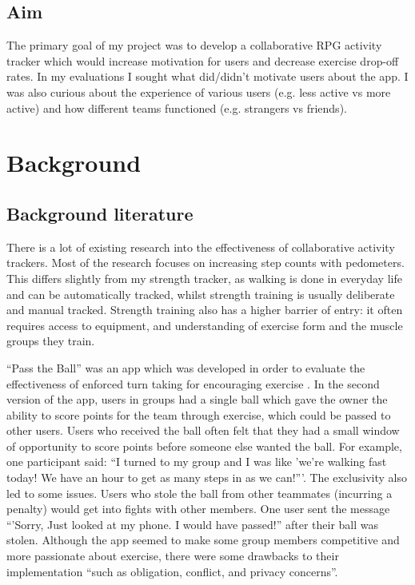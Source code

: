 \documentclass{l4proj}
\begin{document}
\section{Aim}
The primary goal of my project was to develop a collaborative RPG activity tracker which would increase motivation for users and decrease exercise drop-off rates. In my evaluations I sought what did/didn't motivate users about the app. I was also curious about the experience of various users (e.g. less active vs more active) and how different teams functioned (e.g. strangers vs friends).  



\chapter{Background}

\section{Background literature}
There is a lot of existing research into the effectiveness of collaborative activity trackers. Most of the research focuses on increasing step counts with pedometers. This differs slightly from my strength tracker, as walking is done in everyday life and can be automatically tracked, whilst strength training is usually deliberate and manual tracked. Strength training also has a higher barrier of entry: it often requires access to equipment, and understanding of exercise form and the muscle groups they train.

``Pass the Ball'' was an app which was developed in order to evaluate the effectiveness of enforced turn taking for encouraging exercise \citep{Pass_the_ball}. In the second version of the app, users in groups had a single ball which gave the owner the ability to score points for the team through exercise, which could be passed to other users. Users who received the ball often felt that they had a small window of opportunity to score points before someone else wanted the ball. For example, one participant said: ``I turned to my group and I was like 'we’re walking fast today! We have an hour to get as many steps in as we can!'''. The exclusivity also led to some issues. Users who stole the ball from other teammates (incurring a penalty) would get into fights with other members. One user sent the message ``'Sorry, Just looked at my phone. I would have passed!'' after their ball was stolen. Although the app seemed to make some group members competitive and more passionate about exercise, there were some drawbacks to their implementation ``such as obligation, conflict, and privacy concerns''.
\end{document}
